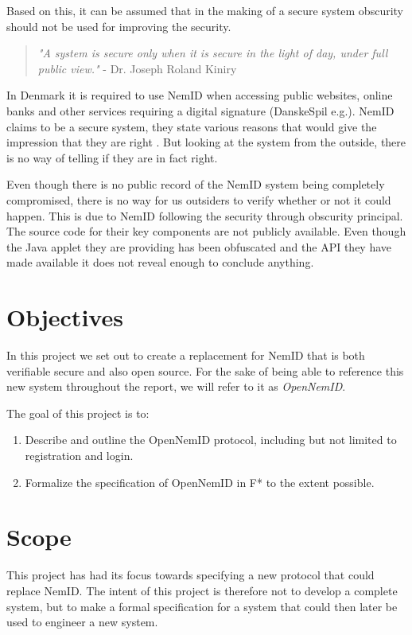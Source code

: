 \documentclass[twosided]{report}
\begin{document}
Based on this, it can be assumed that in the making of a secure system obscurity should not be used for improving the security.
\begin{quote}
\textit{"A system is secure only when it is secure in the light of day, under full public view."} - Dr. Joseph Roland Kiniry \cite{ftspeech}
\end{quote}
\par
In Denmark it is required to use NemID when accessing public websites, online banks and other services requiring a digital signature (DanskeSpil e.g.). NemID claims to be a secure system, they state various reasons that would give the impression that they are right \cite{omnemidsikkerhed}. But looking at the system from the outside, there is no way of telling if they are in fact right.
\par
Even though there is no public record of the NemID system being completely compromised, there is no way for us outsiders to verify whether or not it could happen. This is due to NemID following the security through obscurity principal. The source code for their key components are not publicly available. Even though the Java applet they are providing has been obfuscated and the API they have made available it does not reveal enough to conclude anything.

\newpage
\section{Objectives}
In this project we set out to create a replacement for NemID that is both verifiable secure and also open source. For the sake of being able to reference this new system throughout the report, we will refer to it as \emph{OpenNemID}.
\\
\par
The goal of this project is to:
\begin{enumerate}
	\item Describe and outline the OpenNemID protocol, including but not limited to registration and login.
	\item Formalize the specification of OpenNemID in F* to the extent possible.
\end{enumerate}

\section{Scope}
This project has had its focus towards specifying a new protocol that could replace NemID. The intent of this project is therefore not to develop a complete system, but to make a formal specification for a system that could then later be used to engineer a new system.
\end{document}
